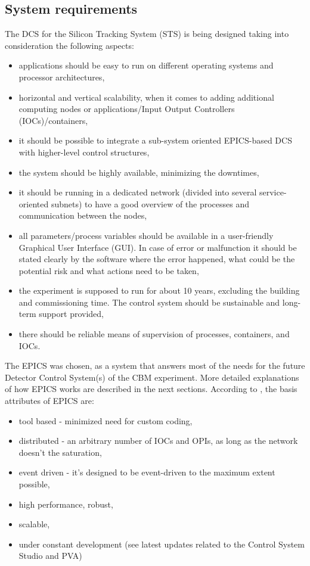 \subsection{System requirements}
 The \gls{DCS} for the Silicon Tracking System (\gls{STS}) is being designed taking into consideration the following aspects:
 \begin{itemize}
     \item applications should be easy to run on different operating systems and processor architectures,
     \item horizontal and vertical scalability, when it comes to adding additional computing nodes or applications/Input Output Controllers (\glspl{IOC})/containers,
     \item it should be possible to integrate a sub-system oriented \gls{EPICS}-based \gls{DCS} with higher-level control structures,
     \item the system should be highly available, minimizing the downtimes,
     \item it should be running in a dedicated network (divided into several service-oriented subnets) to have a good overview of the processes and communication between the nodes,
     \item all parameters/process variables should be available in a user-friendly Graphical User Interface (\gls{GUI}). In case of error or malfunction it should be stated clearly by the software where the error happened, what could be the potential risk and what actions need to be taken,
     \item the experiment is supposed to run for about 10 years, excluding the building and commissioning time. The control system should be sustainable and long-term support provided,
     \item there should be reliable means of supervision of processes, containers, and \glspl{IOC}.
 \end{itemize}

The \gls{EPICS} was chosen, as a system that answers most of the needs for the future Detector Control System(s) of the \gls{CBM} experiment. More detailed explanations of how \gls{EPICS} works are described in the next sections. According to \cite{EPICS_DOCS}, the basis attributes of \gls{EPICS} are:
\begin{itemize}
    \item tool based - minimized need for custom coding,
    \item distributed - an arbitrary number of \glspl{IOC} and \glspl{OPI}, as long as the network doesn't the saturation,
    \item event driven - it's designed to be event-driven to the maximum extent possible,
    \item high performance, robust,
    \item scalable,
    \item under constant development (see latest updates related to the Control System Studio and PVA)
\end{itemize}

